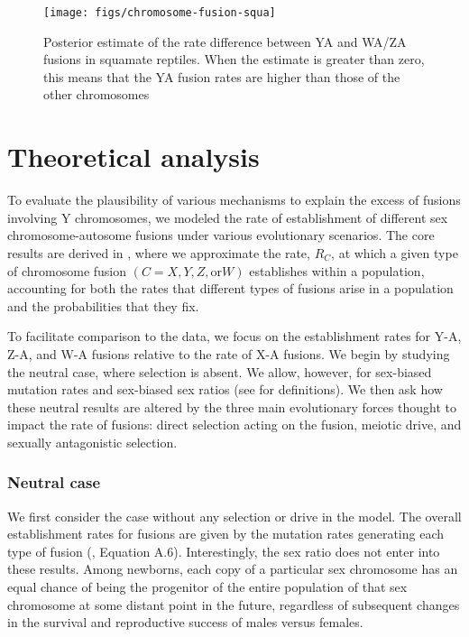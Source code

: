 \begin{figure}[p]
\centering
\texttt{[image: figs/chromosome-fusion-squa]}
\caption[Comparison of Y-autosome and W-/Z-autosome fusion rates (squamates)]{Posterior estimate of the rate difference between YA and WA/ZA fusions in squamate reptiles. When the estimate is greater than zero, this means that the YA fusion rates are higher than those of the other chromosomes}
\label{fig:squa-ind}
\end{figure}

\section{Theoretical analysis}

To evaluate the plausibility of various mechanisms to explain the excess of fusions involving Y chromosomes, we modeled the rate of establishment of different sex chromosome-autosome fusions under various evolutionary scenarios. The core results are derived in , where we approximate the rate, $R_C$, at which a given type of chromosome fusion $(C = X, Y, Z, \text{or} W)$ establishes within a population, accounting for both the rates that different types of fusions arise in a population and the probabilities that they fix.

To facilitate comparison to the data, we focus on the establishment rates for Y-A, Z-A, and W-A fusions relative to the rate of X-A fusions. We begin by studying the neutral case, where selection is absent. We allow, however, for sex-biased mutation rates and sex-biased sex ratios (see  for definitions). We then ask how these neutral results are altered by the three main evolutionary forces thought to impact the rate of fusions: direct selection acting on the fusion, meiotic drive, and sexually antagonistic selection.

\subsubsection{Neutral case}

We first consider the case without any selection or drive in the model. The overall establishment rates for fusions are given by the mutation rates generating each type of fusion (, Equation A.6). Interestingly, the sex ratio does not enter into these results. Among newborns, each copy of a particular sex chromosome has an equal chance of being the progenitor of the entire population of that sex chromosome at some distant point in the future, regardless of subsequent changes in the survival and reproductive success of males versus females. 

